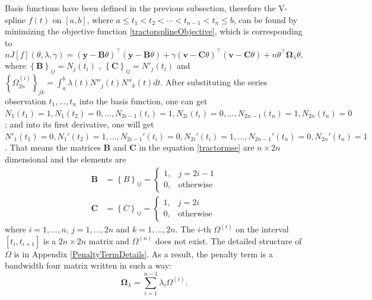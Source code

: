 Basis functions have been defined in the previous subsection, therefore the V-spline $f(t)$ on $[a,b]$, where $a \leq t_1 < t_2< \cdots < t_{n-1}<t_n \leq b$, can be found by minimizing the objective function \eqref{tractorsplineObjective}, which is corresponding to
\begin{equation}\label{tractormse}
nJ[f](\theta, \lambda,\gamma) = \left(\mathbf{y}-\mathbf{B}\theta\right)^\top \left(\mathbf{y}-\mathbf{B}\theta\right) +\gamma \left(\mathbf{v}-\mathbf{C}\theta\right)^\top \left(\mathbf{v}-\mathbf{C}\theta\right)+n \theta^\top\mathbf{\Omega}_{\lambda}\theta,
\end{equation}
where $\left\lbrace \mathbf{B}\right\rbrace_{ij} = N_j(t_i)$ , $\left\lbrace \mathbf{C}\right\rbrace_{ij} = N'_j(t_i)$ and $\left\lbrace \Omega_{2n}^{(i)} \right\rbrace_{jk}=\int_{a}^{b}\lambda(t) N''_j(t)N''_k(t)dt$. After substituting the series observation $t_1, \ldots, t_n$ into the basis function, one can get $N_1(t_1)=1, N_1(t_2)=0, \ldots, N_{2i-1}(t_{i})=1, N_{2i}(t_{i})=0, \ldots, N_{2n-1}(t_n)=1, N_{2n}(t_n)=0$; and into its first derivative, one will get $N'_1(t_1)=0, N_1'(t_2)=1, \ldots, N_{2i-1}'(t_{i})=0, N_{2i}'(t_{i})=1, \ldots, N_{2n-1}'(t_n)=0, N_{2n}'(t_n)=1$. That means the matrices $\mathbf{B}$ and $\mathbf{C}$ in the equation \eqref{tractormse} are $n \times 2n$ dimensional and the elements are
\begin{align}
\mathbf{B}&=\left\lbrace B\right\rbrace_{ij}=\begin{cases}
1, & j=2i-1\\
0, & \mbox{otherwise}
\end{cases}\\
\mathbf{C}&=\left\lbrace C\right\rbrace_{ij}=\begin{cases}
1, & j=2i\\
0, & \mbox{otherwise}
\end{cases}
\end{align}
where $i=1, \ldots, n$, $j=1,\ldots,2n$ and $k=1,\ldots,2n$. The $i$-th $\Omega^{(i)}$ on the interval $[t_i,t_{i+1}]$ is a $2n \times 2n$ matrix and $\Omega^{(n)}$ does not exist. The detailed structure of $\Omega$ is in Appendix \ref{PenaltyTermDetails}. As a result, the penalty term is a bandwidth four matrix written in such a way:
\begin{equation}
\mathbf{\Omega}_\lambda=\sum_{i=1}^{n-1}\lambda_i\Omega^{(i)}.
\end{equation}



